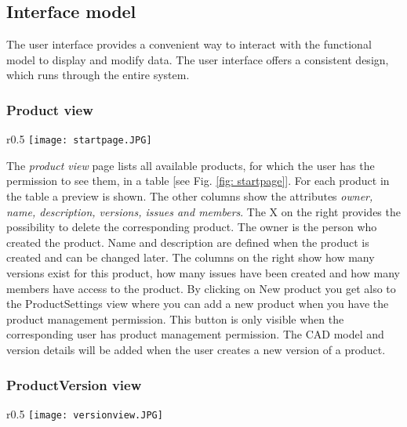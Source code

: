 \subsection{Interface model}

The user interface provides a convenient way to interact with the functional model to display and modify data. The user interface offers a consistent design, which runs through the entire system.

\subsubsection{Product view}

\begin{wrapfigure}{r}{0.5\textwidth}
    \centering
    \texttt{[image: startpage.JPG]}
    \caption{Product view}
    \label{fig: startpage}
\end{wrapfigure}

The \textit{product view} page lists all available products, for which the user has the permission to see them, in a table [see Fig. \ref{fig: startpage}]. For each product in the table a preview is shown. The other columns show the attributes \textit{owner, name, description, versions, issues and members}. The X on the right provides the possibility to delete the corresponding product. The owner is the person who created the product. Name and description are defined when the product is created and can be changed later. The columns on the right show how many versions exist for this product, how many issues have been created and how many members have access to the product. By clicking on New product you get also to the ProductSettings view where you can add a new product when you have the product management permission. This button is only visible when the corresponding user has product management permission. The CAD model and version details will be added when the user creates a new version of a product.

\subsubsection{ProductVersion view}

\begin{wrapfigure}{r}{0.5\textwidth}
    \centering
    \texttt{[image: versionview.JPG]}
    \caption{ProductVersion view}
    \label{fig: versionview}
\end{wrapfigure}

